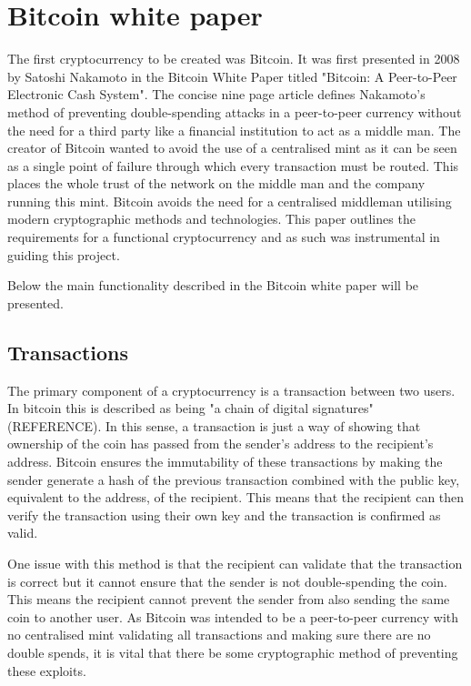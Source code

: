 \documentclass{l4proj}
\begin{document}
\section{Bitcoin white paper}
The first cryptocurrency to be created was Bitcoin. It was first presented in 2008 by Satoshi Nakamoto in the Bitcoin White Paper
titled "Bitcoin: A Peer-to-Peer Electronic Cash System". The concise nine page article defines Nakamoto's method of preventing
double-spending attacks in a peer-to-peer currency without the need for a third party like a financial institution to 
act as a middle man. The creator of Bitcoin wanted to avoid the use of a centralised mint as it can be seen as a single 
point of failure through which every transaction must be routed. This places the whole trust of the network on the middle 
man and the company running this mint.  Bitcoin avoids the need for a centralised middleman utilising modern cryptographic 
methods and technologies. This paper outlines the requirements for a functional cryptocurrency and as such was instrumental 
in guiding this project.

Below the main functionality described in the Bitcoin white paper will be presented.


\subsection{Transactions}
The primary component of a cryptocurrency is a transaction between two users. In bitcoin this is described as being "a
chain of digital signatures" (REFERENCE). In this sense, a transaction is just a way of showing that ownership of the coin has
passed from the sender's address to the recipient's address. Bitcoin ensures the immutability of these transactions
by making the sender generate a hash of the previous transaction combined with the public key, equivalent to the address,
of the recipient. This means that the recipient can then verify the transaction using their own key and the transaction
is confirmed as valid.

One issue with this method is that the recipient can validate that the transaction is correct but it cannot ensure
that the sender is not double-spending the coin. This means the recipient cannot prevent the sender from also sending the 
same coin to another user. As Bitcoin was intended to be a peer-to-peer currency with no centralised mint validating
all transactions and making sure there are no double spends, it is vital that there be some cryptographic method of
preventing these exploits.
\end{document}
